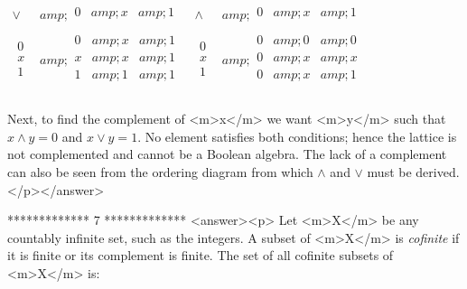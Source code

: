 \(\begin{array}{c|c}
 \lor  &amp; 
\begin{array}{ccc}
 0 &amp; x &amp; 1 \\
\end{array}
 \\
\hline
 
\begin{array}{c}
 0 \\
 x \\
 1 \\
\end{array}
 &amp; 
\begin{array}{ccc}
 0 &amp; x &amp; 1 \\
 x &amp; x &amp; 1 \\
 1 &amp; 1 &amp; 1 \\
\end{array}
 \\
\end{array}\)         \(\begin{array}{c|c}
 \land  &amp; 
\begin{array}{ccc}
 0 &amp; x &amp; 1 \\
\end{array}
 \\
\hline
 
\begin{array}{c}
 0 \\
 x \\
 1 \\
\end{array}
 &amp; 
\begin{array}{ccc}
 0 &amp; 0 &amp; 0 \\
 0 &amp; x &amp; x \\
 0 &amp; x &amp; 1 \\
\end{array}
 \\
\end{array}\)



Next, to find the complement of <m>x</m> we want <m>y</m> such that \(x \land  y = 0\) and \(x \lor  y = 1\). No element satisfies both conditions;
hence the lattice is not complemented and cannot be a Boolean algebra. The lack of a complement can also be seen from the ordering diagram from which
\(\land\) and \(\lor\) must be derived.</p></answer>


*************
7
*************
<answer><p> Let <m>X</m> be any countably infinite set, such as the integers. A subset of <m>X</m> is \textit{ cofinite} if it is finite or its complement
is finite. The set of all cofinite subsets of <m>X</m> is:

